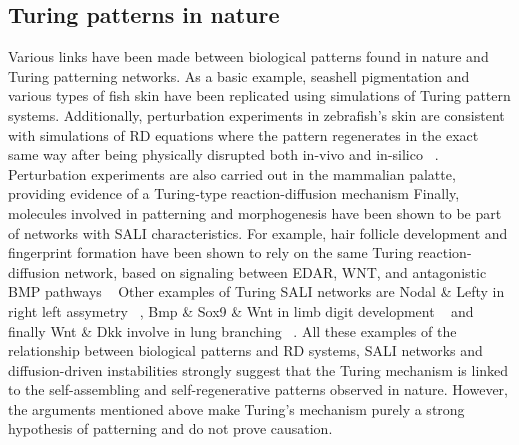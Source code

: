 
\subsection{Turing patterns in nature}
Various links have been made between biological patterns found in nature and Turing patterning networks.
As a basic example, seashell pigmentation and various types of fish skin have been replicated using simulations of Turing pattern systems.
Additionally, perturbation experiments in zebrafish’s skin are consistent with simulations of RD equations where the pattern regenerates in the exact same way after being physically disrupted both in-vivo and in-silico ~\parencite{Kondo2010a}.
Perturbation experiments are also carried out in the mammalian palatte, providing evidence of a Turing-type reaction-diffusion mechanism %
Finally, molecules involved in patterning and morphogenesis have been shown to be part of networks with SALI characteristics.
For example, hair follicle development and fingerprint formation have been shown to rely on the same Turing reaction-diffusion network, based on signaling between EDAR, WNT, and antagonistic BMP pathways ~\parencite{Glover2023}
Other examples of Turing SALI networks are Nodal \& Lefty in right left assymetry ~\parencite{Nakamura2006}, Bmp \& Sox9 \& Wnt in limb digit development ~\parencite{J.Raspopovic1*L.Marcon1*L.Russo1J.Sharpe12014} and finally Wnt \& Dkk involve in lung branching ~\parencite{langhe2005_lung}.
All these examples of the relationship between biological patterns and RD systems, SALI networks and diffusion-driven instabilities strongly suggest that the Turing mechanism is linked to the self-assembling and self-regenerative patterns observed in nature.
However, the arguments mentioned above make Turing’s mechanism purely a strong hypothesis of patterning and do not prove causation.


